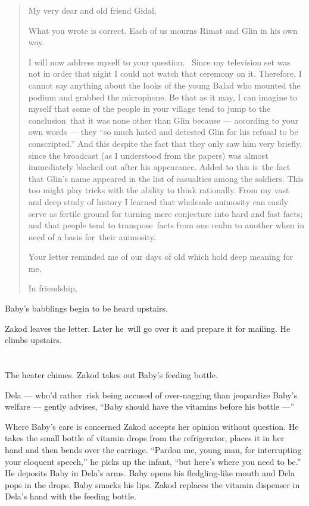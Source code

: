 \documentclass[twoside,11pt,openany]{book}
\begin{document}
\begin{quotation}
My very dear and old friend Gidal,

What you wrote is correct. Each of us mourns Rimat and Glin in his own way.

I will now address myself to your question. ~Since my television set was not in order that night I could not watch that
ceremony on it. Therefore, I cannot say anything about the looks of the young Balad who mounted the podium and
grabbed the microphone. Be that as it may, I can imagine to myself that some of the people in your village tend to jump
to the conclusion~that it was none other than Glin because --- according to your own words --- they ``so
much hated and detested Glin for his refusal to be conscripted.'' And this despite the fact that they only
saw him very briefly, since the broadcast (as I understood from the papers) was almost immediately blacked out after
his appearance. Added to this is~the fact that Glin's name appeared in the list of casualties among the soldiers. This
too might play tricks with the ability to think rationally. From my vast and deep study of history I learned that
wholesale animosity can easily serve as fertile ground for turning mere conjecture into hard and fast facts; and that
people tend to transpose~facts from one realm to another when in need of a basis for~their animosity.

Your letter reminded me of our days of old which hold deep meaning for me.

In friendship,
\end{quotation}

Baby's babblings begin to be heard upstairs.

Zakod leaves the letter. Later he~will go over it and prepare it for mailing. He climbs upstairs.



\chapter{}

The heater chimes. Zakod takes out Baby's feeding bottle.

Dela --- who'd rather~risk being accused of over-nagging than jeopardize Baby's welfare --- gently advises,
``Baby should have the vitamins before his bottle ---''

Where Baby's care is concerned Zakod accepts her opinion without question. He takes the small bottle of vitamin drops
from the refrigerator, places it in her hand and then bends over the carriage. ``Pardon me, young man,
for interrupting your eloquent speech,'' he picks up the infant, ``but here's where you need to
be.'' He deposits Baby in Dela's arms. Baby opens his fledgling-like mouth and Dela pops in the drops.
Baby smacks his lips. Zakod replaces the vitamin dispenser in Dela's hand with the feeding bottle.
\end{document}
